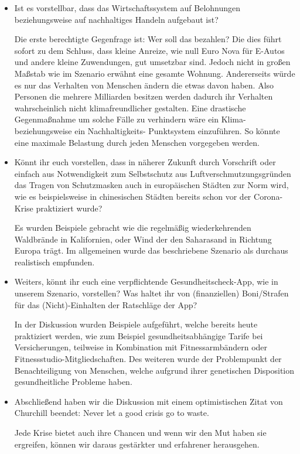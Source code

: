 \documentclass[twoside, a4paper, DIV=11, open=any, bibliography=totoc]{scrbook}
\newcommand{\Quote}[1]{\glqq #1\grqq{}}
\begin{document}
\begin{itemize}
    \item Ist es vorstellbar, dass das Wirtschaftssystem auf Belohnungen 
    beziehungsweise auf nachhaltiges Handeln aufgebaut ist?

    Die erste berechtigte Gegenfrage ist: 
    Wer soll das bezahlen? Die dies führt sofort zu dem Schluss, 
    dass kleine Anreize, wie null Euro Nova für E-Autos und andere kleine Zuwendungen, 
    gut umsetzbar sind. Jedoch nicht in großen Maßstab wie im Szenario erwähnt
    eine gesamte Wohnung. Andererseits würde es nur das Verhalten von Menschen 
    ändern die etwas davon haben. 
    Also Personen die mehrere Milliarden besitzen werden dadurch ihr Verhalten 
    wahrscheinlich nicht klimafreundlicher gestalten. 
    Eine drastische Gegenmaßnahme um solche Fälle zu verhindern wäre ein 
    Klima- beziehungsweise ein Nachhaltigkeits- Punktsystem einzuführen. 
    So könnte eine maximale Belastung durch jeden Menschen vorgegeben werden.    

    \item Könnt ihr euch vorstellen, dass in näherer Zukunft durch Vorschrift
    oder einfach aus Notwendigkeit zum Selbstschutz aus Luftverschmutzungsgründen 
    das Tragen von Schutzmasken auch in europäischen Städten zur Norm wird,
    wie es beispielsweise in chinesischen Städten bereits schon vor der Corona-Krise praktiziert wurde?

    Es wurden Beispiele gebracht wie die regelmäßig wiederkehrenden Waldbrände in
    Kalifornien, oder Wind der den Saharasand in Richtung Europa trägt.
    Im allgemeinen wurde das beschriebene Szenario als durchaus realistisch empfunden.
    \item Weiters, könnt ihr euch eine verpflichtende Gesundheitscheck-App, wie in unserem Szenario, vorstellen?
    Was haltet ihr von (finanziellen) Boni/Strafen für das (Nicht)-Einhalten der Ratschläge der App?
    
    In der Diskussion wurden Beispiele aufgeführt, welche bereits heute praktiziert werden,
    wie zum Beispiel gesundheitsabhängige Tarife bei Versicherungen, teilweise in
    Kombination mit Fitnessarmbändern oder Fitnessstudio-Mitgliedschaften.
    Des weiteren wurde der Problempunkt der Benachteiligung von Menschen,
    welche aufgrund ihrer genetischen Disposition gesundheitliche Probleme haben.
    
    \item Abschließend haben wir die Diskussion mit einem optimistischen
    Zitat von Churchill beendet: \Quote{Never let a good crisis go to waste.}
    
    Jede Krise bietet auch ihre Chancen und wenn wir den Mut haben sie ergreifen, können wir
    daraus gestärkter und erfahrener herausgehen.
\end{itemize}
\end{document}
